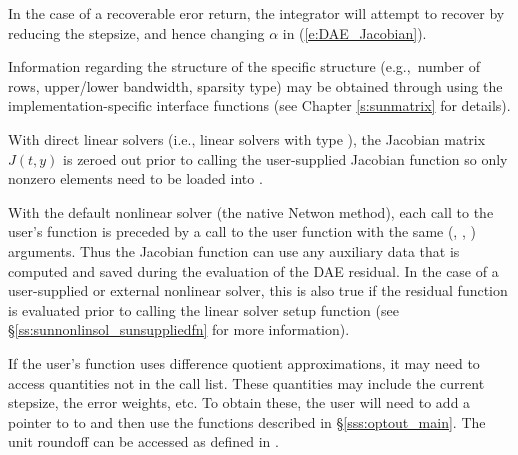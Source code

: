 {{  In the case of a recoverable eror return,
  the integrator will attempt to recover by reducing the stepsize,
  and hence changing $\alpha$ in (\ref{e:DAE_Jacobian}).
}
{
  Information regarding the structure of the specific {\sunmatrix}
  structure (e.g.,~number of rows, upper/lower bandwidth, sparsity
  type) may be obtained through using the implementation-specific
  {\sunmatrix} interface functions (see Chapter \ref{s:sunmatrix} for
  details).

  With direct linear solvers (i.e., linear solvers with type
  ), the Jacobian matrix $J(t,y)$ is zeroed out
  prior to calling the user-supplied Jacobian function so only nonzero elements
  need to be loaded into .

  With the default nonlinear solver (the native {\sundials} Netwon method), each
  call to the user's  function is preceded by a call to the
   user function with the same (, , )
  arguments. Thus the Jacobian function can use any auxiliary data that is
  computed and saved during the evaluation of the DAE residual. In the case of a
  user-supplied or external nonlinear solver, this is also true if the residual
  function is evaluated prior to calling the linear solver setup function
  (see \S\ref{ss:sunnonlinsol_sunsuppliedfn} for more information).

  If the user's  function uses difference
  quotient approximations, it may need to access quantities not in the
  call list. These quantities may include the current stepsize, the error weights, etc.
  To obtain these, the user will need to add a pointer to 
  to  and then use the  functions described in
  \S\ref{sss:optout_main}. The unit roundoff can be accessed as
   defined in .

}}
